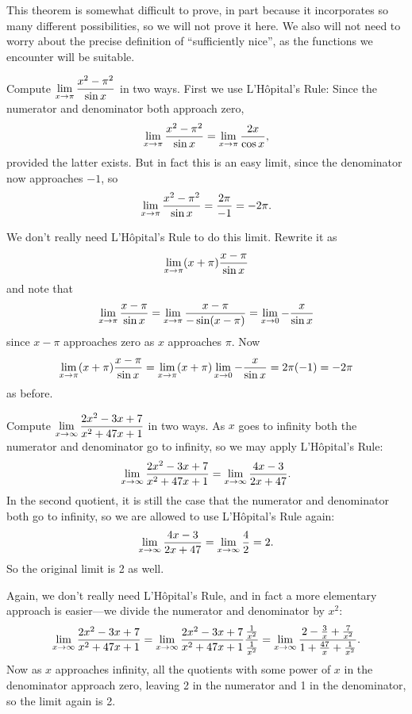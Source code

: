 This theorem is somewhat difficult to prove, in part because it
incorporates so many different possibilities, so we will not prove it
here. We also will not need to worry about the precise definition of 
``sufficiently nice'', as the functions we encounter will be
suitable. 


\begin{example}
Compute $\displaystyle\lim_{x\to \pi}{x^2-\pi^2\over \sin x}$ in two ways.
\msk
First we use L'H\^opital's Rule: Since the numerator and denominator
both approach zero,
$$\lim_{x\to \pi}{x^2-\pi^2\over \sin x}=
\lim_{x\to \pi}{2x \over \cos x},$$
provided the latter exists. But in fact this is an easy limit, since
the denominator now approaches $-1$, so 
$$\lim_{x\to \pi}{x^2-\pi^2\over \sin x}={2\pi\over -1} = -2\pi.$$

We don't really need L'H\^opital's Rule to do this limit. Rewrite it
as 
$$\lim_{x\to \pi}(x+\pi){x-\pi\over \sin x}$$
and note that 
$$\lim_{x\to \pi}{x-\pi\over \sin x}=
\lim_{x\to \pi}{x-\pi\over -\sin (x-\pi)}=
\lim_{x\to 0}-{x\over \sin x}$$
since $x-\pi$ approaches zero as $x$ approaches $\pi$.
Now
$$\lim_{x\to \pi}(x+\pi){x-\pi\over \sin x}=
\lim_{x\to \pi}(x+\pi)\lim_{x\to 0}-{x\over \sin x}=
2\pi(-1)=-2\pi$$
as before.
\end{example}

\begin{example} Compute $\displaystyle\lim_{x\to \infty}{2x^2-3x+7\over
x^2+47x+1}$ in two ways.
\msk
As $x$ goes to infinity both the numerator and denominator go to
infinity, so we may apply L'H\^opital's Rule:
$$\lim_{x\to \infty}{2x^2-3x+7\over x^2+47x+1}=
\lim_{x\to \infty}{4x-3\over 2x+47}.$$
In the second quotient, it is still the case that the numerator and
denominator both go to infinity, so we are allowed to use
L'H\^opital's Rule again:
$$\lim_{x\to \infty}{4x-3\over 2x+47}=\lim_{x\to \infty}{4\over 2}=2.$$
So the original limit is 2 as well.

Again, we don't really need L'H\^opital's Rule, and in fact a more
elementary approach is easier---we divide the numerator and
denominator by $x^2$:
$$\lim_{x\to \infty}{2x^2-3x+7\over x^2+47x+1}=
\lim_{x\to \infty}{2x^2-3x+7\over x^2+47x+1}{{1\over x^2}\over {1\over
    x^2}}=
\lim_{x\to \infty}{2-{3\over x}+{7\over x^2}\over
1+{47\over x}+{1\over x^2}}.$$
Now as $x$ approaches infinity, all the quotients with some power of
$x$ in the denominator approach zero, leaving 2 in the numerator and 1
in the denominator, so the limit again is 2.
\end{example}

